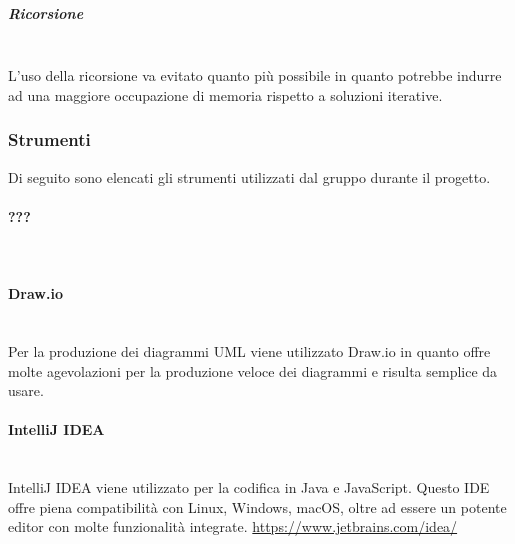 \subparagraph{Ricorsione} \mbox{}\\
L’uso della ricorsione va evitato quanto più possibile in  quanto  potrebbe
indurre  ad  una  maggiore  occupazione  di  memoria  rispetto  a  soluzioni
iterative.
\subsubsection{Strumenti}
Di seguito sono elencati gli strumenti utilizzati dal gruppo durante il progetto.
\paragraph{???} \mbox{}\\

\paragraph{Draw.io} \mbox{}\\
Per la produzione dei diagrammi UML viene utilizzato Draw.io in quanto offre molte agevolazioni per la produzione veloce dei diagrammi e risulta semplice da usare.
\paragraph{IntelliJ IDEA} \mbox{}\\
IntelliJ IDEA viene utilizzato per la codifica in Java e JavaScript. Questo IDE offre piena compatibilità con Linux, Windows, macOS, oltre ad essere un potente editor con molte funzionalità integrate.
\url{https://www.jetbrains.com/idea/}